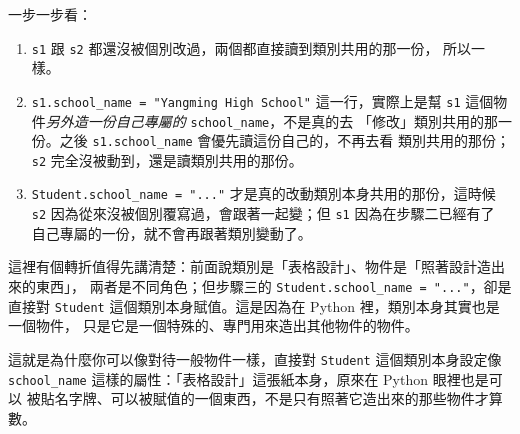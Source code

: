 一步一步看：

\begin{enumerate}
\item \texttt{s1} 跟 \texttt{s2} 都還沒被個別改過，兩個都直接讀到類別共用的那一份，
所以一樣。
\item \texttt{s1.school\_name = "Yangming High School"} 這一行，實際上是幫
\texttt{s1} 這個物件\textit{另外造一份自己專屬的} \texttt{school\_name}，不是真的去
「修改」類別共用的那一份。之後 \texttt{s1.school\_name} 會優先讀這份自己的，不再去看
類別共用的那份；\texttt{s2} 完全沒被動到，還是讀類別共用的那份。
\item \texttt{Student.school\_name = "..."} 才是真的改動類別本身共用的那份，這時候
\texttt{s2} 因為從來沒被個別覆寫過，會跟著一起變；但 \texttt{s1} 因為在步驟二已經有了
自己專屬的一份，就不會再跟著類別變動了。
\end{enumerate}

這裡有個轉折值得先講清楚：前面說類別是「表格設計」、物件是「照著設計造出來的東西」，
兩者是不同角色；但步驟三的 \texttt{Student.school\_name = "..."}，卻是直接對
\texttt{Student} 這個類別本身賦值。這是因為在 Python 裡，類別本身其實也是一個物件，
只是它是一個特殊的、專門用來造出其他物件的物件。

這就是為什麼你可以像對待一般物件一樣，直接對 \texttt{Student} 這個類別本身設定像
\texttt{school\_name} 這樣的屬性：「表格設計」這張紙本身，原來在 Python 眼裡也是可以
被貼名字牌、可以被賦值的一個東西，不是只有照著它造出來的那些物件才算數。


